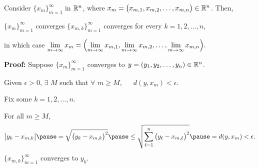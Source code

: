 \documentclass[10pt,aspectratio=169]{beamer}
\begin{document}
%
%
%
%

\begin{frame}

\begin{proposition}
Consider $\{ x_m \}_{m=1}^\infty$ in ${\mathbb{R}}^n$,
where $x_m = \bigl(x_{m,1},x_{m,2},\ldots,x_{m,n}\bigr) \in {\mathbb{R}}^n$.
\pause
Then,

 $\{ x_m \}_{m=1}^\infty$ converges \wiffif
$\{ x_{m,k} \}_{m=1}^\infty$ converges for every $k=1,2,\ldots,n$,

\medskip
\pause
in which case
\qquad
$\displaystyle
\lim_{m\to\infty}
x_m =
\Bigl(
\lim_{m\to\infty} x_{m,1},
\lim_{m\to\infty} x_{m,2},
\ldots,
\lim_{m\to\infty} x_{m,n}
\Bigr) .
$
\end{proposition}

\pause

\textbf{Proof:}
Suppose
$\{ x_m \}_{m=1}^\infty$ converges to
$y = (y_1,y_2,\ldots,y_n) \in {\mathbb{R}}^n$.

\pause
\medskip

Given $\epsilon > 0$, $\exists$ $M$ such that $\forall$ $m \geq M$, ~~
$d(y,x_m) < \epsilon$.

\pause
\medskip

Fix some $k=1,2,\ldots,n$.

\pause
For all $m \geq M$,
\begin{equation*}
\bigl\lvert y_k - x_{m,k} \bigr\rvert
\pause
=
\sqrt{{\bigl(y_k - x_{m,k} \bigr)}^2}
\pause
\leq
\sqrt{\sum_{\ell=1}^n {\bigl(y_\ell-x_{m,\ell}\bigr)}^2}
\pause
= d(y,x_m) < \epsilon .
\end{equation*}
\pause
\thus \quad $\{ x_{m,k} \}_{m=1}^\infty$ converges to $y_k$.

\end{frame}
\end{document}
